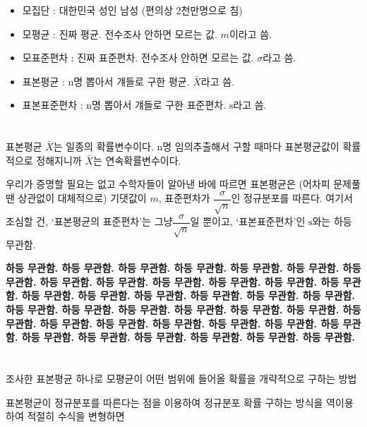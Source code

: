 \documentclass{oblivoir}
\begin{document}
\begin{itemize}
    \item 모집단 : 대한민국 성인 남성 (편의상 2천만명으로 침)
    \item 모평균 : 진짜 평균. 전수조사 안하면 모르는 값. $m$이라고 씀.
    \item 모표준편차 : 진짜 표준편차. 전수조사 안하면 모르는 값. $\sigma$라고 씀.
    \item 표본평균 : n명 뽑아서 걔들로 구한 평균. $\bar{X}$라고 씀.
    \item 표본표준편차 : n명 뽑아서 걔들로 구한 표준편차. $\mathrm{s}$라고 씀.
\end{itemize}


\section{}

표본평균  $\bar{X}$는 일종의 확률변수이다.
n명 임의추출해서 구할 때마다 표본평균값이 확률적으로 정해지니까 $\bar{X}$는 연속확률변수이다.

우리가 증명할 필요는 없고 수학자들이 알아낸 바에 따르면
표본평균은 (어차피 문제풀땐 상관없이 대체적으로) 기댓값이 $m$, 표준편차가 $\dfrac{\sigma}{\sqrt{n}}$인 정규분포를 따른다.
여기서 조심할 건, `표본평균의 표준편차'는 그냥$\dfrac{\sigma}{\sqrt{n}}$일 뿐이고, `표본표준편차'인 $\mathrm{s}$와는 하등 무관함.

\begin{center}
    
\textbf{하등 무관함. 하등 무관함. 하등 무관함. 하등 무관함. 하등 무관함. 하등 무관함. 하등 무관함. 하등 무관함. 하등 무관함. 하등 무관함. 하등 무관함. 하등 무관함. 하등 무관함. 하등 무관함. 하등 무관함. 하등 무관함. 하등 무관함. 하등 무관함. 하등 무관함. 하등 무관함. 하등 무관함. 하등 무관함. 하등 무관함. 하등 무관함. 하등 무관함. 하등 무관함. 하등 무관함. 하등 무관함. 하등 무관함. 하등 무관함. 하등 무관함. 하등 무관함. 하등 무관함. 하등 무관함. 하등 무관함. 하등 무관함. 하등 무관함. 하등 무관함. }

\end{center}

\section{}
조사한 표본평균 하나로 모평균이 어떤 범위에 들어올 확률을 개략적으로 구하는 방법

표본평균이 정규분포를 따른다는 점을 이용하여
정규분포 확률 구하는 방식을 역이용하여 적절히 수식을 변형하면
\end{document}
